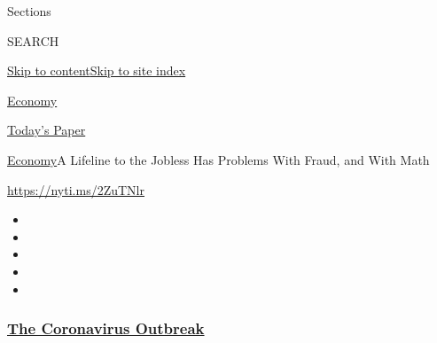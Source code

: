 Sections

SEARCH

\protect\hyperlink{site-content}{Skip to
content}\protect\hyperlink{site-index}{Skip to site index}

\href{https://www.nytimes3xbfgragh.onion/section/business/economy}{Economy}

\href{https://myaccount.nytimes3xbfgragh.onion/auth/login?response_type=cookie\&client_id=vi}{}

\href{https://www.nytimes3xbfgragh.onion/section/todayspaper}{Today's
Paper}

\href{/section/business/economy}{Economy}\textbar{}A Lifeline to the
Jobless Has Problems With Fraud, and With Math

\url{https://nyti.ms/2ZuTNlr}

\begin{itemize}
\item
\item
\item
\item
\item
\end{itemize}

\hypertarget{the-coronavirus-outbreak}{%
\subsubsection{\texorpdfstring{\href{https://www.nytimes3xbfgragh.onion/news-event/coronavirus?name=styln-coronavirus-markets\&region=TOP_BANNER\&block=storyline_menu_recirc\&action=click\&pgtype=Article\&impression_id=15b96c00-f4b6-11ea-89a3-d9fd6cbe23e4\&variant=undefined}{The
Coronavirus
Outbreak}}{The Coronavirus Outbreak}}\label{the-coronavirus-outbreak}}

